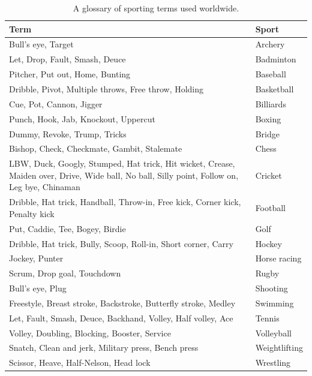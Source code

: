 \documentclass[
  openany]{book}
\begin{document}
\begin{table}

\caption{\label{tab:sporting-terminologies}A glossary of sporting terms used worldwide.}
\centering
\begin{tabular}[t]{>{\raggedright\arraybackslash}p{18em}>{\raggedright\arraybackslash}p{8em}}
\toprule
Term & Sport\\
\midrule
\rowcolor{gray!6}  Bull's eye, Target & Archery\\
Let, Drop, Fault, Smash, Deuce & Badminton\\
\rowcolor{gray!6}  Pitcher, Put out, Home, Bunting & Baseball\\
Dribble, Pivot, Multiple throws, Free throw, Holding & Basketball\\
\rowcolor{gray!6}  Cue, Pot, Cannon, Jigger & Billiards\\
\addlinespace
Punch, Hook, Jab, Knockout, Uppercut & Boxing\\
\rowcolor{gray!6}  Dummy, Revoke, Trump, Tricks & Bridge\\
Bishop, Check, Checkmate, Gambit, Stalemate & Chess\\
\rowcolor{gray!6}  LBW, Duck, Googly, Stumped, Hat trick, Hit wicket, Crease, Maiden over, Drive, Wide ball, No ball, Silly point, Follow on, Leg bye, Chinaman & Cricket\\
Dribble, Hat trick, Handball, Throw-in, Free kick, Corner kick, Penalty kick & Football\\
\addlinespace
\rowcolor{gray!6}  Put, Caddie, Tee, Bogey, Birdie & Golf\\
Dribble, Hat trick, Bully, Scoop, Roll-in, Short corner, Carry & Hockey\\
\rowcolor{gray!6}  Jockey, Punter & Horse racing\\
Scrum, Drop goal, Touchdown & Rugby\\
\rowcolor{gray!6}  Bull's eye, Plug & Shooting\\
\addlinespace
Freestyle, Breast stroke, Backstroke, Butterfly stroke, Medley & Swimming\\
\rowcolor{gray!6}  Let, Fault, Smash, Deuce, Backhand, Volley, Half volley, Ace & Tennis\\
Volley, Doubling, Blocking, Booster, Service & Volleyball\\
\rowcolor{gray!6}  Snatch, Clean and jerk, Military press, Bench press & Weightlifting\\
Scissor, Heave, Half-Nelson, Head lock & Wrestling\\
\bottomrule
\end{tabular}
\end{table}
\end{document}
